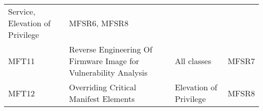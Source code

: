 \documentclass[0-thesis.tex]{subfiles}
\begin{document}
\begin{longtable}[]{@{}llll@{}}
\begin{minipage}[t]{0.30\columnwidth}
    Service, Elevation of Privilege\strut \end{minipage} &
    \begin{minipage}[t]{0.09\columnwidth}\raggedright\strut MFSR6, MFSR8\strut
    \end{minipage}\tabularnewline
    \begin{minipage}[t]{0.05\columnwidth}\raggedright\strut MFT11\strut \end{minipage} &
    \begin{minipage}[t]{0.44\columnwidth}\raggedright\strut Reverse Engineering Of
    Firmware Image for Vulnerability Analysis\strut \end{minipage} &
    \begin{minipage}[t]{0.30\columnwidth}\raggedright\strut All classes\strut
    \end{minipage} & \begin{minipage}[t]{0.09\columnwidth}\raggedright\strut MFSR7\strut
    \end{minipage}\tabularnewline
    \begin{minipage}[t]{0.05\columnwidth}\raggedright\strut MFT12\strut \end{minipage} &
    \begin{minipage}[t]{0.44\columnwidth}\raggedright\strut Overriding Critical Manifest
    Elements\strut \end{minipage} &
    \begin{minipage}[t]{0.30\columnwidth}\raggedright\strut Elevation of Privilege\strut
    \end{minipage} & \begin{minipage}[t]{0.09\columnwidth}\raggedright\strut MFSR8\strut
    \end{minipage}\tabularnewline
    \bottomrule
\end{longtable}
\end{document}
